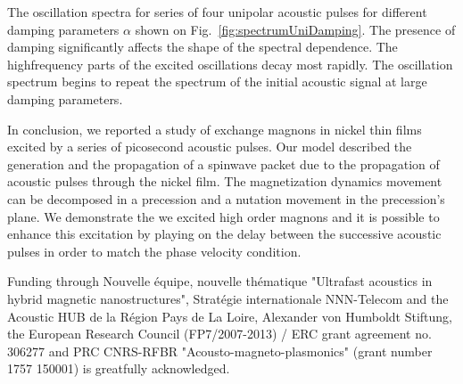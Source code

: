 \documentclass[%
superscriptaddress,
preprint,
showpacs,
amsmath,
amssymb,
aps,
prl,
]{revtex4-1}
\begin{document}
The oscillation spectra for series of four unipolar acoustic pulses for different damping parameters $\alpha$ shown on Fig.~\ref{fig:spectrumUniDamping}. The presence of damping significantly affects the shape of the spectral dependence. The highfrequency parts of the excited oscillations decay most rapidly. The oscillation spectrum begins to repeat the spectrum of the initial acoustic signal at large damping parameters.
	

In conclusion, we reported a study of exchange magnons in nickel thin films excited by a series of picosecond acoustic pulses.
Our model described the generation and the propagation of a spinwave packet due to the propagation of acoustic pulses through the nickel film.
The magnetization dynamics movement can be decomposed in a precession and a nutation movement in the precession's plane.
We demonstrate the we excited high order magnons and it is possible to enhance this excitation by playing on the delay between the successive acoustic pulses in order to match the phase velocity condition.
	
\bigskip
	
Funding through Nouvelle \'{e}quipe, nouvelle th\'{e}matique "Ultrafast acoustics in hybrid magnetic nanostructures", Strat\'{e}gie internationale NNN-Telecom and the Acoustic HUB de la R\'{e}gion Pays de La Loire, Alexander von Humboldt Stiftung, the European Research Council (FP7/2007-2013) / ERC grant agreement no. 306277 and PRC CNRS-RFBR "Acousto-magneto-plasmonics" (grant number 1757 150001) is greatfully acknowledged.
	

	
\end{document}
